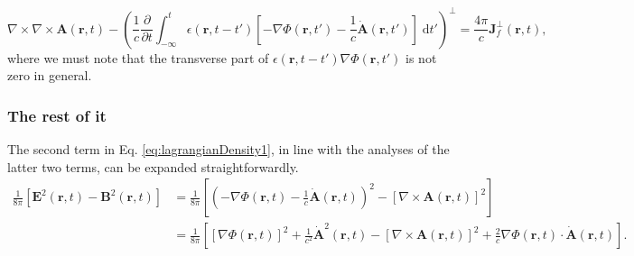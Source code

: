 \documentclass{article}
\begin{document}
\begin{equation}
\nabla\times\nabla\times\mathbf{A}(\mathbf{r},t) - \left(\frac{1}{c}\frac{\partial}{\partial t}\int_{-\infty}^t\epsilon(\mathbf{r},t - t')\left[-\nabla\Phi(\mathbf{r},t') - \frac{1}{c}\dot{\mathbf{A}}(\mathbf{r},t')\right]\;\mathrm{d}t'\right)^\perp = \frac{4\pi}{c}\mathbf{J}^\perp_f(\mathbf{r},t),
\end{equation}
where we must note that the transverse part of $\epsilon(\mathbf{r},t - t')\nabla\Phi(\mathbf{r},t')$ is not zero in general. 











\subsubsection{The rest of it}

The second term in Eq. \eqref{eq:lagrangianDensity1}, in line with the analyses of the latter two terms, can be expanded straightforwardly. 
\begin{equation}
\begin{split}
\frac{1}{8\pi}\left[\mathbf{E}^2(\mathbf{r},t) - \mathbf{B}^2(\mathbf{r},t)\right] &= \frac{1}{8\pi}\left[\left(-\nabla\Phi(\mathbf{r},t) - \frac{1}{c}\dot{\mathbf{A}}(\mathbf{r},t)\right)^2 - \left[\nabla\times\mathbf{A}(\mathbf{r},t)\right]^2\right]\\
&= \frac{1}{8\pi}\left[\left[\nabla\Phi(\mathbf{r},t)\right]^2 + \frac{1}{c^2}\dot{\mathbf{A}}^2(\mathbf{r},t) - \left[\nabla\times\mathbf{A}(\mathbf{r},t)\right]^2 + \frac{2}{c}\nabla\Phi(\mathbf{r},t)\cdot\dot{\mathbf{A}}(\mathbf{r},t)\right].
\end{split}
\end{equation}
\end{document}
